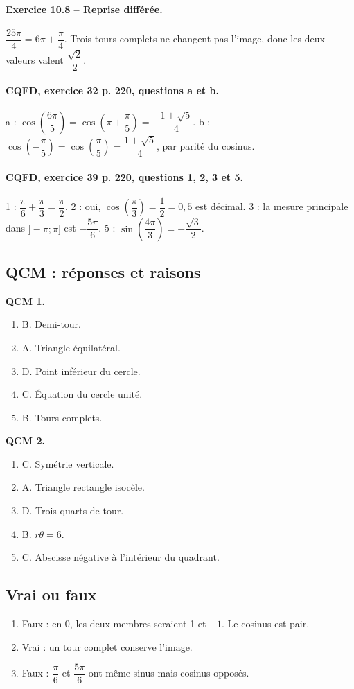 \paragraph{Exercice 10.8 -- Reprise différée.} $\dfrac{25\pi}{4}=6\pi +\dfrac{\pi}{4}$. Trois tours complets ne changent pas l’image, donc les deux valeurs valent $\dfrac{\sqrt 2}{2}$.
\paragraph{CQFD, exercice 32 p. 220, questions a et b.} a : $\cos(\dfrac{6\pi}5)=\cos(\pi+\dfrac\pi5)=-\dfrac{1+\sqrt5}{4}$. b : $\cos(-\dfrac\pi5)=\cos(\dfrac\pi5)=\dfrac{1+\sqrt5}{4}$, par parité du cosinus.
\paragraph{CQFD, exercice 39 p. 220, questions 1, 2, 3 et 5.} 1 : $\dfrac\pi6+\dfrac\pi3=\dfrac\pi2$. 2 : oui, $\cos(\dfrac\pi3)=\dfrac12=0{,}5$ est décimal. 3 : la mesure principale dans $]-\pi;\pi]$ est $-\dfrac{5\pi}6$. 5 : $\sin(\dfrac{4\pi}3)=-\dfrac{\sqrt3}2$.
\subsection*{QCM : réponses et raisons}
\textbf{QCM 1.}
\begin{enumerate}
\item B. Demi-tour.
\item A. Triangle équilatéral.
\item D. Point inférieur du cercle.
\item C. Équation du cercle unité.
\item B. Tours complets.
\end{enumerate}
\textbf{QCM 2.}
\begin{enumerate}
\item C. Symétrie verticale.
\item A. Triangle rectangle isocèle.
\item D. Trois quarts de tour.
\item B. $r\theta=6$.
\item C. Abscisse négative à l’intérieur du quadrant.
\end{enumerate}
\subsection*{Vrai ou faux}
\begin{enumerate}
\item Faux : en 0, les deux membres seraient 1 et $-1$. Le cosinus est pair.
\item Vrai : un tour complet conserve l’image.
\item Faux : $\dfrac{\pi}{6}$ et $\dfrac{5\pi}{6}$ ont même sinus mais cosinus opposés.
\end{enumerate}

